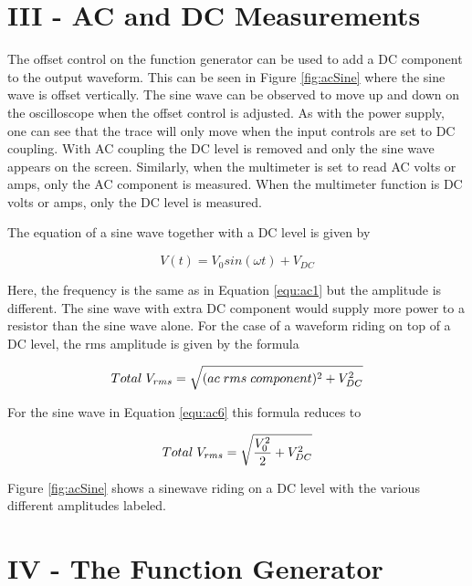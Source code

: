 \section{{\bf III - AC and DC Measurements}}

The offset control on the function generator can be used to add a DC component to the output waveform. This can be seen in Figure \ref{fig:acSine} where the sine wave is offset vertically. The sine wave can be observed to move up and down on the oscilloscope when the offset control is adjusted. As with the power supply, one can see that the trace will only move when the input controls are set to DC coupling. With AC coupling the DC level is removed and only the sine wave appears on the screen. Similarly, when the multimeter is set to read AC volts or amps, only the AC component is measured. When the multimeter function is DC volts or amps, only the DC level is measured.

The equation of a sine wave together with a DC level is given by

\begin{equation}
V(t)=V_0sin(\omega t)+V_{DC}
\label{equ:ac6}
\end{equation}

Here, the frequency is the same as in Equation \ref{equ:ac1} but the amplitude is different. The sine wave with extra DC component would supply more power to a resistor than the sine wave alone. For the case of a waveform riding on top of a DC level, the rms amplitude is given by the formula

\begin{equation}
Total \hspace{1mm} V_{rms}=\sqrt{(ac\hspace{1mm} rms\hspace{1mm} component)^2+V_{DC}^2}
\label{equ:ac7}
\end{equation}

For the sine wave in Equation \ref{equ:ac6} this formula reduces to

\begin{equation}
Total \hspace{1mm} V_{rms}=\sqrt{\frac{V_0^2}{2}+V_{DC}^2}
\label{equ:ac8}
\end{equation}

Figure \ref{fig:acSine} shows a sinewave riding on a DC level with the various different amplitudes labeled.






\section{{\bf IV - The Function Generator}}

